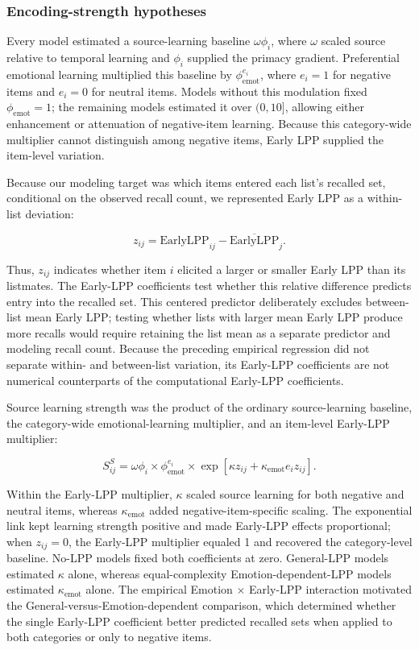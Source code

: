 \documentclass[
  man,
  longtable,
  nolmodern,
  notxfonts,
  notimes,
  draftfirst,
  colorlinks=true,linkcolor=blue,citecolor=blue,urlcolor=blue]{apa7}
\begin{document}
\subsubsection{Encoding-strength
hypotheses}\label{encoding-strength-hypotheses}

Every model estimated a source-learning baseline \(\omega\phi_i\), where
\(\omega\) scaled source relative to temporal learning and \(\phi_i\)
supplied the primacy gradient. Preferential emotional learning
multiplied this baseline by \(\phi_{\mathrm{emot}}^{e_i}\), where
\(e_i=1\) for negative items and \(e_i=0\) for neutral items. Models
without this modulation fixed \(\phi_{\mathrm{emot}}=1\); the remaining
models estimated it over \((0,10]\), allowing either enhancement or
attenuation of negative-item learning. Because this category-wide
multiplier cannot distinguish among negative items, Early LPP supplied
the item-level variation.

Because our modeling target was which items entered each list's recalled
set, conditional on the observed recall count, we represented Early LPP
as a within-list deviation:

\[
z_{ij}
=
\mathrm{EarlyLPP}_{ij}
-
\overline{\mathrm{EarlyLPP}}_j.
\]

Thus, \(z_{ij}\) indicates whether item \(i\) elicited a larger or
smaller Early LPP than its listmates. The Early-LPP coefficients test
whether this relative difference predicts entry into the recalled set.
This centered predictor deliberately excludes between-list mean Early
LPP; testing whether lists with larger mean Early LPP produce more
recalls would require retaining the list mean as a separate predictor
and modeling recall count. Because the preceding empirical regression
did not separate within- and between-list variation, its Early-LPP
coefficients are not numerical counterparts of the computational
Early-LPP coefficients.

Source learning strength was the product of the ordinary source-learning
baseline, the category-wide emotional-learning multiplier, and an
item-level Early-LPP multiplier:

\[
S_{ij}^S
=
\omega\phi_i
\times
\phi_{\mathrm{emot}}^{e_i}
\times
\exp\!\left[
\kappa z_{ij}
+
\kappa_{\mathrm{emot}}e_i z_{ij}
\right].
\]

Within the Early-LPP multiplier, \(\kappa\) scaled source learning for
both negative and neutral items, whereas \(\kappa_{\mathrm{emot}}\)
added negative-item-specific scaling. The exponential link kept learning
strength positive and made Early-LPP effects proportional; when
\(z_{ij}=0\), the Early-LPP multiplier equaled 1 and recovered the
category-level baseline. No-LPP models fixed both coefficients at zero.
General-LPP models estimated \(\kappa\) alone, whereas equal-complexity
Emotion-dependent-LPP models estimated \(\kappa_{\mathrm{emot}}\) alone.
The empirical Emotion \(\times\) Early-LPP interaction motivated the
General-versus-Emotion-dependent comparison, which determined whether
the single Early-LPP coefficient better predicted recalled sets when
applied to both categories or only to negative items.
\end{document}
